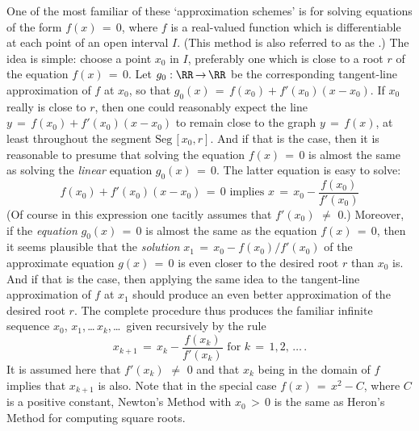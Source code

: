         One of the most familiar of these `approximation schemes' is {\bf {}} for solving equations of the form $f(x) \,=\, 0$,
    where $f$ is a real-valued function which is differentiable at each point of an open interval $I$.
    (This method is also referred to as the {\bf {}}.)
    The idea is simple: choose a point $x_{0}$ in $I$, preferably one which is close to a root $r$ of the equation $f(x) \,=\, 0$.
    Let $g_{0}:{\RR} \,{\rightarrow}\, {\RR}$ be the corresponding tangent-line approximation of $f$ at $x_{0}$,
    so that $g_{0}(x) \,=\, f(x_{0}) + f'(x_{0})(x-x_{0})$. If $x_{0}$ really is close to $r$,
    then one could reasonably expect the line $y \,=\, f(x_{0}) + f'(x_{0})(x-x_{0})$
    to remain close to the graph $y \,=\, f(x)$, at least throughout the segment $\mbox{Seg}\,[x_{0},r]$.
    And if that is the case, then it is reasonable to presume that solving the equation $f(x) \,=\, 0$
    is almost the same as solving the {\em linear} equation $g_{0}(x) \,=\, 0$. The latter equation is easy to solve:
        \begin{displaymath}
        f(x_{0}) + f'(x_{0})(x-x_{0}) \,=\, 0 \mbox{ implies }
        x \,=\, x_{0} - \frac{f(x_{0})}{f'(x_{0})}
        \end{displaymath}
    (Of course in this expression one tacitly assumes that $f'(x_{0}) \,\,{\neq}\,\, 0$.)
    Moreover, if the {\em equation} $g_{0}(x) \,=\, 0$ is almost the same as the equation $f(x) \,=\, 0$,
    then it seems plausible that the {\em solution} $x_{1} \,=\, x_{0}-f(x_{0})/f'(x_{0})$ of the approximate equation $g(x) \,=\, 0$
    is even closer to the desired root $r$ than $x_{0}$ is. And if that is the case,
    then applying the same idea to the tangent-line approximation of $f$ at $x_{1}$ should produce an even better approximation of the desired root $r$.
    The complete procedure thus produces the familiar infinite sequence $x_{0}$, $x_{1}$,\,{\ldots}\,$x_{k}$,\,{\ldots}\, given recursively by the rule
        \begin{displaymath}
        x_{k+1} \,=\, x_{k} - \frac{f(x_{k})}{f'(x_{k})} \mbox{ for $k \,=\, 1,2,\,{\ldots}\,$}.
        \end{displaymath}
    It is assumed here that $f'(x_{k}) \,\,{\neq}\,\, 0$ and that $x_{k}$ being in the domain of $f$ implies that $x_{k+1}$ is also.
    Note that in the special case $f(x) \,=\, x^{2}-C$, where $C$ is a positive constant,
    Newton's Method with $x_{0}\,>\,0$ is the same as Heron's Method for computing square roots.

